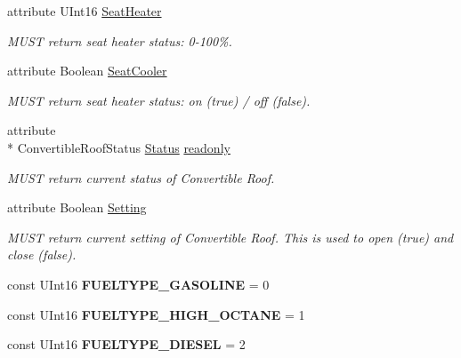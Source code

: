 \begin{DoxyCompactItemize}
attribute U\+Int16 \hyperlink{interfaceVehiclePropertyType_a5dfb32720d0946f544bda753ea049276}{Seat\+Heater}
\begin{DoxyCompactList}\small\item\em M\+U\+S\+T return seat heater status\+: 0-\/100\%. \end{DoxyCompactList}\item 
attribute Boolean \hyperlink{interfaceVehiclePropertyType_aa6e78716c3c9d68fbeaae573d142a8db}{Seat\+Cooler}
\begin{DoxyCompactList}\small\item\em M\+U\+S\+T return seat heater status\+: on (true) / off (false). \end{DoxyCompactList}\item 
attribute \\*
Convertible\+Roof\+Status \hyperlink{interfaceVehiclePropertyType_adc169ce047115d43399d1ffa9dd1fb83}{Status} \hyperlink{interfaceVehiclePropertyType_a80c4d8f18eee83fc77fded4ac07c687b}{readonly}
\begin{DoxyCompactList}\small\item\em M\+U\+S\+T return current status of Convertible Roof. \end{DoxyCompactList}\item 
attribute Boolean \hyperlink{interfaceVehiclePropertyType_ad09472a4b0e02adc79d0c4fe29131120}{Setting}
\begin{DoxyCompactList}\small\item\em M\+U\+S\+T return current setting of Convertible Roof. This is used to open (true) and close (false). \end{DoxyCompactList}\item 
\hypertarget{interfaceVehiclePropertyType_a977b3244a1649427b1893b440f705b68}{const U\+Int16 {\bfseries F\+U\+E\+L\+T\+Y\+P\+E\+\_\+\+G\+A\+S\+O\+L\+I\+N\+E} = 0}\label{interfaceVehiclePropertyType_a977b3244a1649427b1893b440f705b68}

\item 
\hypertarget{interfaceVehiclePropertyType_ae9f2becc65a05a117bb5305e2e47b5a3}{const U\+Int16 {\bfseries F\+U\+E\+L\+T\+Y\+P\+E\+\_\+\+H\+I\+G\+H\+\_\+\+O\+C\+T\+A\+N\+E} = 1}\label{interfaceVehiclePropertyType_ae9f2becc65a05a117bb5305e2e47b5a3}

\item 
\hypertarget{interfaceVehiclePropertyType_a4abde753d3a62ca9258d2cd8f5c5e827}{const U\+Int16 {\bfseries F\+U\+E\+L\+T\+Y\+P\+E\+\_\+\+D\+I\+E\+S\+E\+L} = 2}\label{interfaceVehiclePropertyType_a4abde753d3a62ca9258d2cd8f5c5e827}


\end{DoxyCompactItemize}
